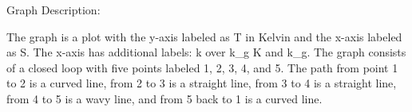 Graph Description:

The graph is a plot with the y-axis labeled as T in Kelvin and the x-axis labeled as S. The x-axis has additional labels: k over k_g K and k_g. The graph consists of a closed loop with five points labeled 1, 2, 3, 4, and 5. The path from point 1 to 2 is a curved line, from 2 to 3 is a straight line, from 3 to 4 is a straight line, from 4 to 5 is a wavy line, and from 5 back to 1 is a curved line.